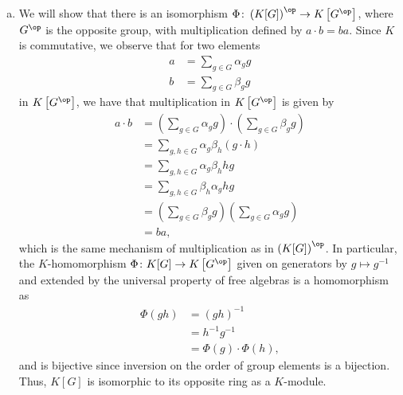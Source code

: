\documentclass[10pt]{mypackage}
\begin{document}
\begin{solution}
\begin{enumerate}[(a)]
      Now, note that $\varphi_b$ is the zero map if and only if $ab = 0$ for all $a\in R$, which occurs only when $b = 0$. Therefore, the map $\Phi$ is injective. Surjectivity follows from the fact that we may define a right inverse $\Psi\colon \operatorname{end}_R(R)\rightarrow R^{\op}$ taking $\varphi\mapsto \varphi(1)$, satisfying $\Phi(\Psi(\varphi)) = \Phi(\varphi(1)) = \varphi_{\varphi(1)} = \varphi$.
    \item We will show that there is an isomorphism $\Phi\colon \left( K[G] \right)^{\op}\rightarrow K\left[ G^{\op} \right]$, where $G^{\op}$ is the opposite group, with multiplication defined by $a\cdot b = ba$. Since $K$ is commutative, we observe that for two elements
      \begin{align*}
        a &= \sum_{g\in G} \alpha_g g\\
        b &= \sum_{g\in G} \beta_g g
      \end{align*}
      in $K\left[ G^{\op} \right]$, we have that multiplication in $K\left[ G^{\op} \right]$ is given by
      \begin{align*}
        a\cdot b &= \left( \sum_{g\in G}\alpha_g g \right) \cdot \left( \sum_{g\in G}\beta_g g \right)\\
                 &= \sum_{g,h\in G} \alpha_g\beta_h \left( g\cdot h \right)\\
                 &= \sum_{g,h\in G} \alpha_g\beta_h hg\\
                 &= \sum_{g,h\in G} \beta_h \alpha_g hg\\
                 &= \left( \sum_{g\in G}\beta_g g \right) \left( \sum_{g\in G}\alpha_g g \right)\\
                 &= ba,
      \end{align*}
      which is the same mechanism of multiplication as in $\left( K[G] \right)^{\op}$. In particular, the $K$-homomorphism $\Phi\colon K[G]\rightarrow K\left[ G^{\op} \right]$ given on generators by $g\mapsto g^{-1}$ and extended by the universal property of free algebras is a homomorphism as 
      \begin{align*}
        \Phi\left( gh \right) &= \left( gh \right)^{-1}\\
                              &= h^{-1}g^{-1}\\
                              &= \Phi\left( g \right)\cdot \Phi\left( h \right),
      \end{align*}
      and is bijective since inversion on the order of group elements is a bijection. Thus, $K[G]$ is isomorphic to its opposite ring as a $K$-module.
  \end{enumerate}
\end{solution}
\end{document}
